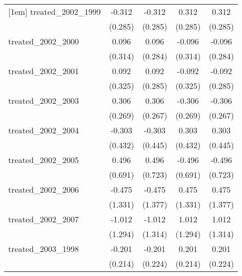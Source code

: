 {\begin{tabular}{l*{4}{c}}
[1em]
treated\_2002\_1999&      -0.312         &      -0.312         &       0.312         &       0.312         \\
            &     (0.285)         &     (0.285)         &     (0.285)         &     (0.285)         \\
[1em]
treated\_2002\_2000&       0.096         &       0.096         &      -0.096         &      -0.096         \\
            &     (0.314)         &     (0.284)         &     (0.314)         &     (0.284)         \\
[1em]
treated\_2002\_2001&       0.092         &       0.092         &      -0.092         &      -0.092         \\
            &     (0.325)         &     (0.285)         &     (0.325)         &     (0.285)         \\
[1em]
treated\_2002\_2003&       0.306         &       0.306         &      -0.306         &      -0.306         \\
            &     (0.269)         &     (0.267)         &     (0.269)         &     (0.267)         \\
[1em]
treated\_2002\_2004&      -0.303         &      -0.303         &       0.303         &       0.303         \\
            &     (0.432)         &     (0.445)         &     (0.432)         &     (0.445)         \\
[1em]
treated\_2002\_2005&       0.496         &       0.496         &      -0.496         &      -0.496         \\
            &     (0.691)         &     (0.723)         &     (0.691)         &     (0.723)         \\
[1em]
treated\_2002\_2006&      -0.475         &      -0.475         &       0.475         &       0.475         \\
            &     (1.331)         &     (1.377)         &     (1.331)         &     (1.377)         \\
[1em]
treated\_2002\_2007&      -1.012         &      -1.012         &       1.012         &       1.012         \\
            &     (1.294)         &     (1.314)         &     (1.294)         &     (1.314)         \\
[1em]
treated\_2003\_1998&      -0.201         &      -0.201         &       0.201         &       0.201         \\
            &     (0.214)         &     (0.224)         &     (0.214)         &     (0.224)         \\

\end{tabular}}

